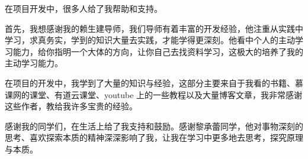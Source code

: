 
\thesisacknowledgement
  在项目开发中，很多人给了我帮助和支持。
  \par
  首先，我想感谢我的赖生建导师，我们导师有着丰富的开发经验，他注重从实践中学习，求真务实，学到的知识大量去实践，才能学得更深刻。他看中个人的主动学习能力，给你指明一个大体的方向，让你自己去找资料学习，这极大的培养了我的主动学习能力。
  \par
  在项目的开发中，我学到了大量的知识与经验，这部分主要来自于我看的书籍、慕课网的课堂、有道云课堂、youtube 上的一些教程以及大量博客文章，我非常感谢这些作者，教给我许多宝贵的经验。
  \par
  感谢我的同学们，在生活上给了我支持和鼓励。感谢黎承蕾同学，他对事物深刻的思考、喜欢探索本质的精神深深影响了我，让我在学习中更多地去思考，探究原理与本质。
